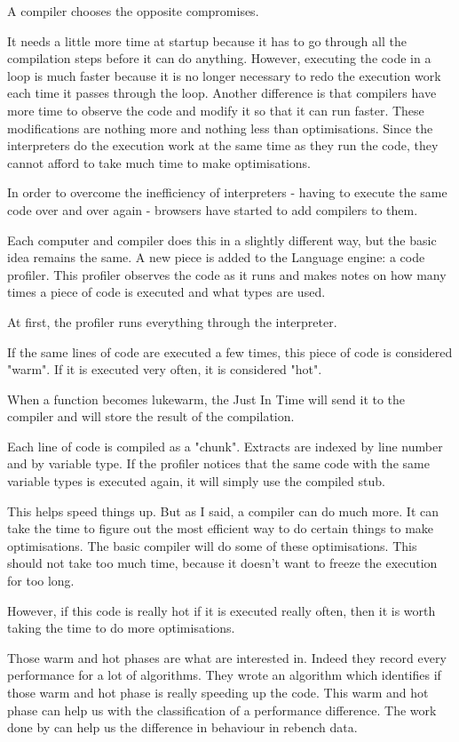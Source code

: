 \documentclass{article}
\begin{document}
A compiler chooses the opposite compromises.

It needs a little more time at startup because it has to go through all the compilation steps before it can do anything. However, executing the code in a loop is much faster because it is no longer necessary to redo the execution work each time it passes through the loop.
Another difference is that compilers have more time to observe the code and modify it so that it can run faster. These modifications are nothing more and nothing less than optimisations. Since the interpreters do the execution work at the same time as they run the code, they cannot afford to take much time to make optimisations.

In order to overcome the inefficiency of interpreters - having to execute the same code over and over again - browsers have started to add compilers to them.

Each computer and compiler does this in a slightly different way, but the basic idea remains the same. A new piece is added to the Language engine: a code profiler. This profiler observes the code as it runs and makes notes on how many times a piece of code is executed and what types are used.

At first, the profiler runs everything through the interpreter.

If the same lines of code are executed a few times, this piece of code is considered "warm". If it is executed very often, it is considered "hot".

When a function becomes lukewarm, the Just In Time will send it to the compiler and will store the result of the compilation.

Each line of code is compiled as a "chunk". Extracts are indexed by line number and by variable type. If the profiler notices that the same code with the same variable types is executed again, it will simply use the compiled stub.

This helps speed things up. But as I said, a compiler can do much more. It can take the time to figure out the most efficient way to do certain things to make optimisations. The basic compiler will do some of these optimisations. This should not take too much time, because it doesn't want to freeze the execution for too long.

However, if this code is really hot if it is executed really often, then it is worth taking the time to do more optimisations.

Those warm and hot phases are what \citep{barrett2017virtual} are interested in. Indeed they record every performance for a lot of algorithms. They wrote an algorithm which identifies if those warm and hot phase is really speeding up the code. This warm and hot phase can help us with the classification of a performance difference. The work done by \citep{barrett2017virtual} can help us the difference in behaviour in rebench data.
\end{document}
